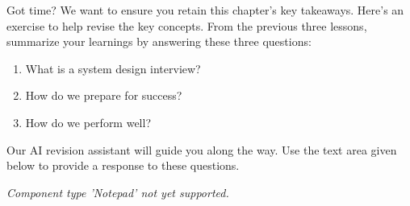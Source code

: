Got time? We want to ensure you retain this chapter's key takeaways. Here's an exercise to help revise the key concepts. From the previous three lessons, summarize your learnings by answering these three questions:

\begin{enumerate}
\item
{}\label{0dqhRnNDhUglettzbB56r}
What is a system design interview?
\item
{}\label{w4J-AWtpALS7JMhU_4tfF}
How do we prepare for success?
\item
{}\label{JdzVL_VfgBp1BJcVFXbV2}
How do we perform well?
\end{enumerate}

Our AI revision assistant will guide you along the way. Use the text area given below to provide a response to these questions.

\textit{Component type 'Notepad' not yet supported.}

